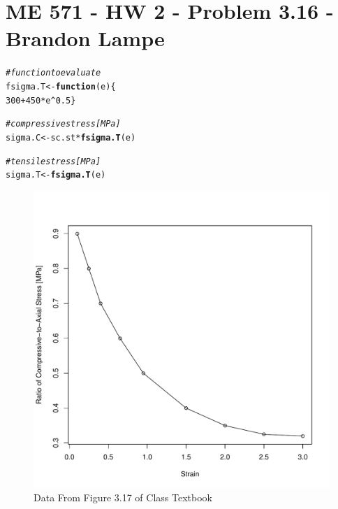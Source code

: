 \documentclass{article}\usepackage[]{graphicx}\usepackage[]{color}
\makeatletter
\def\maxwidth{ %
  \ifdim\Gin@nat@width>\linewidth
    \linewidth
  \else
    \Gin@nat@width
  \fi
}
\newcommand{\hlnum}[1]{\textcolor[rgb]{0.686,0.059,0.569}{#1}}%
\newcommand{\hlcom}[1]{\textcolor[rgb]{0.678,0.584,0.686}{\textit{#1}}}%
\newcommand{\hlopt}[1]{\textcolor[rgb]{0,0,0}{#1}}%
\newcommand{\hlstd}[1]{\textcolor[rgb]{0.345,0.345,0.345}{#1}}%
\newcommand{\hlkwa}[1]{\textcolor[rgb]{0.161,0.373,0.58}{\textbf{#1}}}%
\newcommand{\hlkwb}[1]{\textcolor[rgb]{0.69,0.353,0.396}{#1}}%
\newcommand{\hlkwc}[1]{\textcolor[rgb]{0.333,0.667,0.333}{#1}}%
\newcommand{\hlkwd}[1]{\textcolor[rgb]{0.737,0.353,0.396}{\textbf{#1}}}%
\newenvironment{kframe}{%
 \def\at@end@of@kframe{}%
 \ifinner\ifhmode%
  \def\at@end@of@kframe{\end{minipage}}%
  \begin{minipage}{\columnwidth}%
 \fi\fi%
 \def\FrameCommand##1{\hskip\@totalleftmargin \hskip-\fboxsep
 \colorbox{shadecolor}{##1}\hskip-\fboxsep
     \hskip-\linewidth \hskip-\@totalleftmargin \hskip\columnwidth}%
 \MakeFramed {\advance\hsize-\width
   \@totalleftmargin\z@ \linewidth\hsize
   \@setminipage}}%
 {\par\unskip\endMakeFramed%
 \at@end@of@kframe}
\newenvironment{knitrout}{}{} %
\makeatother
\begin{document}
\section{ME 571 - HW 2 - Problem 3.16 - Brandon Lampe}



\begin{knitrout}
\color{fgcolor}\begin{kframe}
\begin{alltt}
\hlcom{# function to evaluate}
\hlstd{fsigma.T} \hlkwb{<-} \hlkwa{function} \hlstd{(}\hlkwc{e}\hlstd{)\{}
        \hlnum{300} \hlopt{+} \hlnum{450} \hlopt{*} \hlstd{e} \hlopt{^} \hlnum{0.5} \hlstd{\}}

\hlcom{# compressive stress [MPa]}
\hlstd{sigma.C} \hlkwb{<-} \hlstd{sc.st} \hlopt{*} \hlkwd{fsigma.T}\hlstd{(e)}

\hlcom{# tensile stress [MPa]}
\hlstd{sigma.T} \hlkwb{<-} \hlkwd{fsigma.T}\hlstd{(e)}
\end{alltt}
\end{kframe}
\end{knitrout}
\vspace{-.5in}
\begin{figure}[H] \begin{center}
\begin{knitrout}
\color{fgcolor}
\includegraphics[width=\maxwidth]{figure/plot1} 

\end{knitrout}
\end{center} \vspace{-.5in} \caption{Data From Figure 3.17 of Class Textbook} \end{figure}
\end{document}
